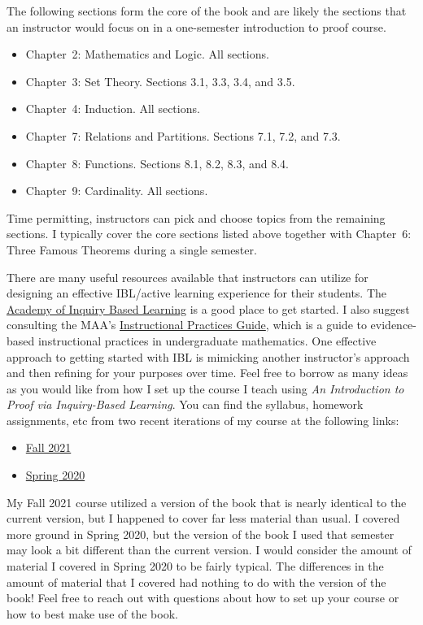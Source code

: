 \documentclass[11pt]{article}%
\newcommand{\blankline}{\pagebreak[2]\vspace{.5\baselineskip}}
\begin{document}
\blankline

The following sections form the core of the book and are likely the sections that an instructor would focus on in a one-semester introduction to proof course.
\begin{itemize}
\item Chapter~2: Mathematics and Logic. All sections.
\item Chapter~3: Set Theory. Sections 3.1, 3.3, 3.4, and 3.5.
\item Chapter~4: Induction. All sections.
\item Chapter~7: Relations and Partitions. Sections 7.1, 7.2, and 7.3.
\item Chapter~8: Functions. Sections 8.1, 8.2, 8.3, and 8.4.
\item Chapter~9: Cardinality. All sections.
\end{itemize}
Time permitting, instructors can pick and choose topics from the remaining sections.  I typically cover the core sections listed above together with Chapter~6: Three Famous Theorems during a single semester. 

\blankline

There are many useful resources available that instructors can utilize for designing an effective IBL/active learning experience for their students.  The \href{http://www.inquirybasedlearning.org}{Academy of Inquiry Based Learning} is a good place to get started.  I also suggest consulting the MAA's \href{https://www.maa.org/programs-and-communities/curriculum%20resources/instructional-practices-guide}{Instructional Practices Guide}, which is a guide to evidence-based instructional practices in undergraduate mathematics.  One effective approach to getting started with IBL is mimicking another instructor's approach and then refining for your purposes over time.  Feel free to borrow as many ideas as you would like from how I set up the course I teach using \emph{An Introduction to Proof via Inquiry-Based Learning}.  You can find the syllabus, homework assignments, etc from two recent iterations of my course at the following links:
\begin{itemize}
\item \href{http://danaernst.com/teaching/mat320f21/}{Fall 2021}
\item \href{http://danaernst.com/teaching/mat320s20/}{Spring 2020}
\end{itemize}
My Fall 2021 course utilized a version of the book that is nearly identical to the current version, but I happened to cover far less material than usual.  I covered more ground in Spring 2020, but the version of the book I used that semester may look a bit different than the current version.  I would consider the amount of material I covered in Spring 2020 to be fairly typical.  The differences in the amount of material that I covered had nothing to do with the version of the book!  Feel free to reach out with questions about how to set up your course or how to best make use of the book.
\end{document}
